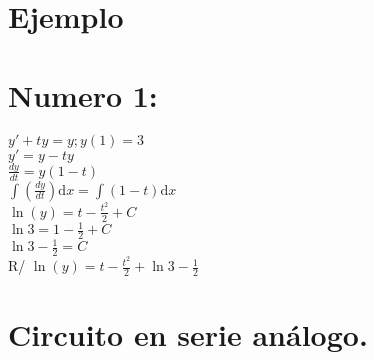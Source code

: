 \documentclass[12pt,a4paper]{article}
\begin{document}
\section*{ Ejemplo }

\section*{Numero 1:}
$y' + ty = y    ;   y (1)= 3 $\vspace{5mm}\\
$y'=y-ty$\vspace{5mm}\\
$\frac{dy}{dt} = y (1-t) $\vspace{5mm}\\
$\int(\frac{dy}{dt} ) \mathrm{d}x =\int( 1-t) \mathrm{d}x$\\$\ln(y)= t-\frac{t^2}{2} + C$\vspace{5mm}\\
$\ln3=1-\frac{1}{2}  + C$\vspace{5mm}\\
$\ln3-\frac{1}{2} = C$\vspace{5mm}\\
R/ $ \ln(y)=t-\frac{t^2}{2} +  \ln3-\frac{1}{2} $ \vspace{5mm}\\
\section{Circuito en serie análogo. }
\end{document}
